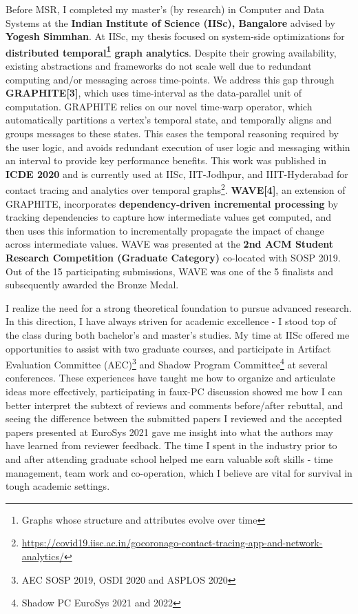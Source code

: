 \documentclass{article}
\newcommand{\graphite}{GRAPHITE\xspace}
\newcommand{\wave}{WAVE\xspace}
\begin{document}

Before MSR, I completed my master's (by research) in Computer and Data Systems at the \textbf{Indian Institute of Science (IISc), Bangalore} advised by \textbf{Yogesh Simmhan}. At IISc, my thesis focused on system-side optimizations for \textbf{distributed temporal\footnote{Graphs whose structure and attributes evolve over time} graph analytics}.
Despite their growing availability, existing abstractions and frameworks do not scale well due to redundant computing and/or messaging across time-points.
We address this gap through \textbf{\graphite[3]}, which uses time-interval as the data-parallel unit of computation.
\graphite relies on our novel time-warp operator, which automatically partitions a vertex’s temporal state, and temporally aligns and groups messages to these states. This eases the temporal reasoning required by the user logic, and avoids redundant execution of user logic and messaging within an interval to provide key performance benefits.
This work was published in \textbf{ICDE 2020} and is currently used at IISc, IIT-Jodhpur, and IIIT-Hyderabad for contact tracing and analytics over temporal graphs\footnote{\url{https://covid19.iisc.ac.in/gocoronago-contact-tracing-app-and-network-analytics/}}.
\textbf{\wave[4]}, an extension of \graphite, incorporates \textbf{dependency-driven incremental processing} by tracking dependencies to capture how intermediate values get computed, and then uses this information to incrementally propagate the impact of change across intermediate values.
\wave was presented at the \textbf{2nd ACM Student Research Competition (Graduate Category)} co-located with SOSP 2019. Out of the 15 participating submissions, \wave was one of the 5 finalists and subsequently awarded the Bronze Medal.


I realize the need for a strong theoretical foundation to pursue advanced research. In this direction, I have always striven for academic excellence - I stood top of the class during both bachelor's and master's studies.
My time at IISc offered me opportunities to assist with two graduate courses, and participate in Artifact Evaluation Committee (AEC)\footnote{AEC SOSP 2019, OSDI 2020 and ASPLOS 2020} and Shadow Program Committee\footnote{Shadow PC EuroSys 2021 and 2022} at several conferences. These experiences have taught me how to organize and articulate ideas more effectively, participating in faux-PC discussion showed me how I can better interpret the subtext of reviews and comments before/after rebuttal, and seeing the difference between the submitted papers I reviewed and the accepted papers presented at EuroSys 2021 gave me insight into what the authors may have learned from reviewer feedback.
The time I spent in the industry prior to and after attending graduate school helped me earn valuable soft skills - time management, team work and co-operation, which I believe are vital for survival in tough academic settings.
\end{document}
